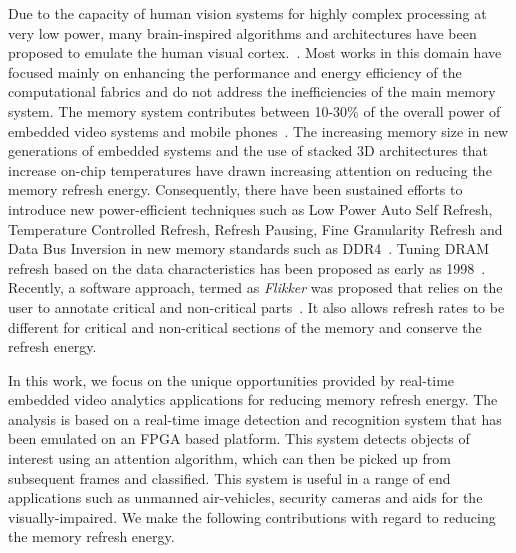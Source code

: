 
Due to the capacity of human vision systems for highly complex processing at very low power, many brain-inspired algorithms and architectures have been proposed to emulate the human visual cortex.~\cite{Nere2011,Chen2014,Kestur2012}. %
Most works in this domain have focused mainly on enhancing the performance and energy efficiency of the computational fabrics and do not address the inefficiencies of the main memory system. The memory system contributes between 10-30\% of the overall power of embedded video systems and mobile phones~\cite{CarrollAaronHeiser2010}. The increasing memory size in new generations of embedded systems and the use of stacked 3D architectures that increase on-chip temperatures have drawn increasing attention on reducing the memory refresh energy. Consequently, there have been sustained efforts to introduce new power-efficient techniques such as Low Power Auto Self Refresh, Temperature Controlled Refresh, Refresh Pausing, Fine Granularity Refresh and Data Bus Inversion in new memory standards such as DDR4~\cite{jedec-sdram-standards}.  
Tuning DRAM refresh based on the data characteristics has been proposed as early as 1998~\cite{islped98}. Recently, a software approach, termed as \emph{Flikker} was proposed that relies on the user to annotate critical and non-critical parts~\cite{Liu2011}. It also allows refresh rates to be different for critical and non-critical sections of the memory and conserve the refresh energy. 

In this work, we focus on the unique opportunities provided by real-time embedded video analytics applications for reducing memory refresh energy. The analysis is based on a real-time image detection and recognition system that has been emulated on an FPGA based platform. This system detects objects of interest using an attention algorithm, which can then be picked up from subsequent frames and classified. This system is useful in a range of end applications such as unmanned air-vehicles, security cameras and aids for the visually-impaired. We make the following contributions with regard to reducing the memory refresh energy.

